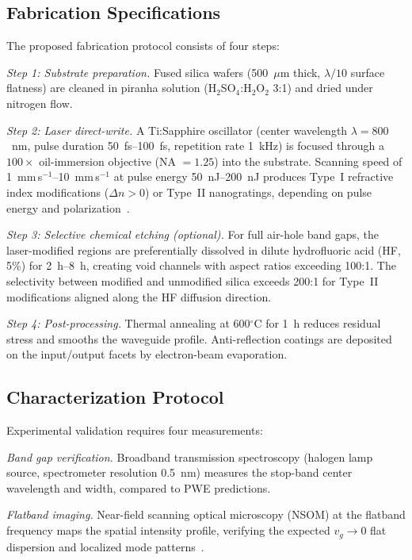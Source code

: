 \documentclass[10pt,letterpaper]{article}
\begin{document}
\subsection{Fabrication Specifications}

The proposed fabrication protocol consists of four steps:

\textit{Step 1: Substrate preparation.} Fused silica wafers (500~$\mu$m thick, $\lambda/10$ surface flatness) are cleaned in piranha solution (H$_2$SO$_4$:H$_2$O$_2$ 3:1) and dried under nitrogen flow.

\textit{Step 2: Laser direct-write.} A Ti:Sapphire oscillator (center wavelength $\lambda = 800$~nm, pulse duration 50~fs--100~fs, repetition rate 1~kHz) is focused through a $100\times$ oil-immersion objective (NA $= 1.25$) into the substrate. Scanning speed of 1~mm\,s$^{-1}$--10~mm\,s$^{-1}$ at pulse energy 50~nJ--200~nJ produces Type~I refractive index modifications ($\Delta n > 0$) or Type~II nanogratings, depending on pulse energy and polarization~\cite{Davis1996}.

\textit{Step 3: Selective chemical etching (optional).} For full air-hole band gaps, the laser-modified regions are preferentially dissolved in dilute hydrofluoric acid (HF, 5\%) for 2~h--8~h, creating void channels with aspect ratios exceeding 100:1. The selectivity between modified and unmodified silica exceeds 200:1 for Type~II modifications aligned along the HF diffusion direction.

\textit{Step 4: Post-processing.} Thermal annealing at 600$^\circ$C for 1~h reduces residual stress and smooths the waveguide profile. Anti-reflection coatings are deposited on the input/output facets by electron-beam evaporation.

\subsection{Characterization Protocol}

Experimental validation requires four measurements:

\textit{Band gap verification.} Broadband transmission spectroscopy (halogen lamp source, spectrometer resolution 0.5~nm) measures the stop-band center wavelength and width, compared to PWE predictions.

\textit{Flatband imaging.} Near-field scanning optical microscopy (NSOM) at the flatband frequency maps the spatial intensity profile, verifying the expected $v_g \to 0$ flat dispersion and localized mode patterns~\cite{Lustig2019}.
\end{document}
